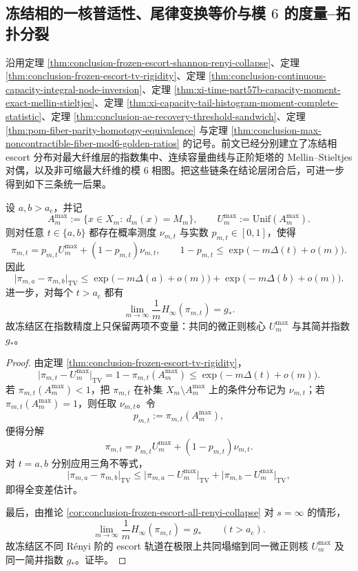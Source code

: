 \subsection{冻结相的一核普适性、尾律变换等价与模 \texorpdfstring{$6$}{6} 的度量--拓扑分裂}\label{subsec:conclusion-freezing-taillaw-noncontractible-mod6-splitting}
沿用定理 \ref{thm:conclusion-frozen-escort-shannon-renyi-collapse}、定理 \ref{thm:conclusion-frozen-escort-tv-rigidity}、定理 \ref{thm:conclusion-continuous-capacity-integral-node-inversion}、定理 \ref{thm:xi-time-part57b-capacity-moment-exact-mellin-stieltjes}、定理 \ref{thm:xi-capacity-tail-histogram-moment-complete-statistic}、定理 \ref{thm:conclusion-ae-recovery-threshold-sandwich}、定理 \ref{thm:pom-fiber-parity-homotopy-equivalence} 与定理 \ref{thm:conclusion-max-noncontractible-fiber-mod6-golden-ratios} 的记号。前文已经分别建立了冻结相 escort 分布对最大纤维层的指数集中、连续容量曲线与正阶矩塔的 Mellin--Stieltjes 对偶，以及非可缩最大纤维的模 \(6\) 相图。把这些链条在结论层闭合后，可进一步得到如下三条统一后果。

\begin{theorem}[冻结相是一核普适相]\label{thm:conclusion-frozen-phase-single-core-universality}
设 \(a,b>a_{\mathrm c}\)，并记
\[
A_m^{\max}:=\{x\in X_m:\ d_m(x)=M_m\},
\qquad
U_m^{\max}:=\mathrm{Unif}(A_m^{\max}).
\]
则对任意 \(t\in\{a,b\}\) 都存在概率测度 \(\nu_{m,t}\) 与实数 \(p_{m,t}\in[0,1]\)，使得
\[
\pi_{m,t}=p_{m,t}U_m^{\max}+(1-p_{m,t})\nu_{m,t},
\qquad
1-p_{m,t}\le \exp\!\bigl(-m\Delta(t)+o(m)\bigr).
\]
因此
\[
\bigl|\pi_{m,a}-\pi_{m,b}\bigr|_{\mathrm{TV}}
\le
\exp\!\bigl(-m\Delta(a)+o(m)\bigr)
+
\exp\!\bigl(-m\Delta(b)+o(m)\bigr).
\]
进一步，对每个 \(t>a_{\mathrm c}\) 都有
\[
\lim_{m\to\infty}\frac{1}{m}H_\infty(\pi_{m,t})=g_\ast.
\]
故冻结区在指数精度上只保留两项不变量：共同的微正则核心 \(U_m^{\max}\) 与其简并指数 \(g_\ast\)。
\end{theorem}
\begin{proof}
由定理 \ref{thm:conclusion-frozen-escort-tv-rigidity}，
\[
\bigl|\pi_{m,t}-U_m^{\max}\bigr|_{\mathrm{TV}}
=
1-\pi_{m,t}(A_m^{\max})
\le
\exp\!\bigl(-m\Delta(t)+o(m)\bigr).
\]
若 \(\pi_{m,t}(A_m^{\max})<1\)，把 \(\pi_{m,t}\) 在补集 \(X_m\setminus A_m^{\max}\) 上的条件分布记为 \(\nu_{m,t}\)；若 \(\pi_{m,t}(A_m^{\max})=1\)，则任取 \(\nu_{m,t}\)。令
\[
p_{m,t}:=\pi_{m,t}(A_m^{\max}),
\]
便得分解
\[
\pi_{m,t}=p_{m,t}U_m^{\max}+(1-p_{m,t})\nu_{m,t}.
\]
对 \(t=a,b\) 分别应用三角不等式，
\[
\bigl|\pi_{m,a}-\pi_{m,b}\bigr|_{\mathrm{TV}}
\le
\bigl|\pi_{m,a}-U_m^{\max}\bigr|_{\mathrm{TV}}
+
\bigl|\pi_{m,b}-U_m^{\max}\bigr|_{\mathrm{TV}},
\]
即得全变差估计。

最后，由推论 \ref{cor:conclusion-frozen-escort-all-renyi-collapse} 对 \(s=\infty\) 的情形，
\[
\lim_{m\to\infty}\frac{1}{m}H_\infty(\pi_{m,t})=g_\ast
\qquad (t>a_{\mathrm c}).
\]
故冻结区不同 Rényi 阶的 escort 轨道在极限上共同塌缩到同一微正则核 \(U_m^{\max}\) 及同一简并指数 \(g_\ast\)。证毕。
\end{proof}

